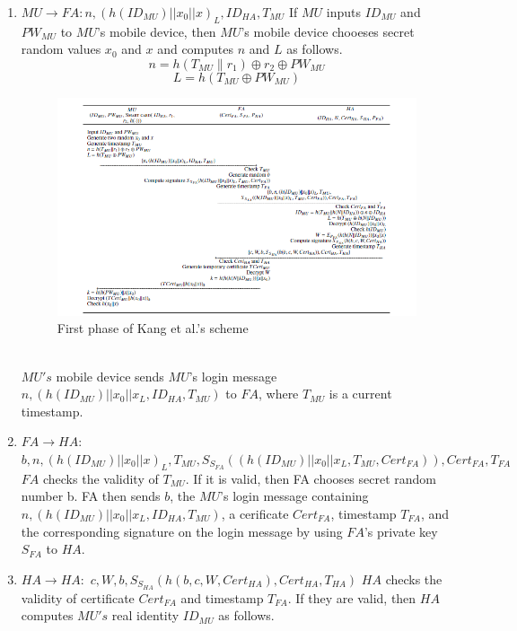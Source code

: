 \documentclass[UTF8]{ctexart}
\begin{document}
\begin{enumerate}
  \item $MU\rightarrow FA:{n,(h(ID_{MU})||x_{0}||x)_{L},ID_{HA},T_{MU}}$
      If $MU$ inputs $ID_{MU}$ and $PW_{MU}$ to $MU$'s mobile device, then $MU$'s mobile device chooeses secret random values $x_{0}$ and $x$ and computes $n$ and $L$ as follows.
      \begin{equation}
        n=h(T_{MU}\|r_1)\oplus r_2\oplus PW_{MU}
      \end{equation}
      \begin{equation}
        L=h(T_{MU}\oplus PW_{MU})
      \end{equation}
\begin{figure}[htb]
  \centering
  \includegraphics[width=1\textwidth]{1.png}
  \caption{First phase of Kang et al.'s scheme}\label{fig1}
\end{figure} \\
$MU's$ mobile device sends $MU$'s login message ${n,(h(ID_{MU})||x_{0}||x_{L},ID_{HA},T_{MU})}$ to $FA$, where $T_{MU}$ is a current timestamp.
  \item $FA\rightarrow HA$: ${b,n,(h(ID_{MU})||x_{0}||x)_{L},T_{MU},S_{S_{FA}}((h(ID_{MU})||x_{0}||x_{L},T_{MU},Cert_{FA})),Cert_{FA},T_{FA}}$ $FA$ checks the validity of $T_{MU}$. If it is valid, then FA chooses secret random number b. FA then sends $b$, the $MU$'s login message containing ${n,(h(ID_{MU})||x_{0}||x_{L},ID_{HA},T_{MU})}$, a cerificate $Cert_{FA}$, timestamp $T_{FA}$, and the corresponding signature on the login message by using $FA$'s private key $S_{FA}$ to $HA$.
  \item $HA\rightarrow HA:$ ${c,W,b,S_{S_{HA}}(h(b,c,W,Cert_{HA}),Cert_{HA},T_{HA})}$
      $HA$ checks the validity of certificate $Cert_{FA}$ and timestamp $T_{FA}$. If they are valid, then $HA$ computes $MU's$ real identity $ID_{MU}$ as follows.

\end{enumerate}
\end{document}
